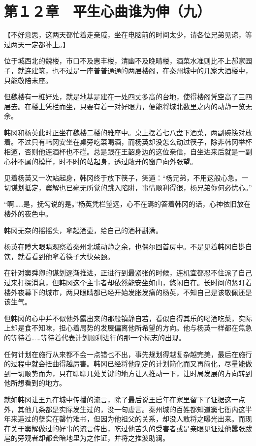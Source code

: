 \section{第１２章　平生心曲谁为伸（九）}

【不好意思，这两天都忙着走亲戚，坐在电脑前的时间太少，请各位兄弟见谅，等过两天一定都补上。】

位于城西北的魏楼，市口不及惠丰楼，清幽不及晚晴楼，酒菜水准则比不上郝家园子，就连建筑，也不过是一座普普通通的两层楼阁，在秦州城中的几家大酒楼中，只能敬陪末座。

但魏楼有一桩好处，就是地基是建在一处四丈多高的台地，使得楼阁凭空高了三四层去。在楼上凭栏而坐，只要有着一对好眼力，便能将城北数里之内的动静一览无余。

韩冈和杨英此时正坐在魏楼二楼的雅座中。桌上摆着七八盘下酒菜，两副碗筷对放着。不过只有韩冈安坐在桌旁吃菜喝酒，而杨英却没怎么动过筷子，除非韩冈举杯相邀，否则他连酒杯也不碰。总是跟在王韶身边的这位亲信，自坐进来后就是一副心神不属的模样，时不时的站起身，透过敞开的窗户向外张望。

见着杨英又一次站起身，韩冈终于放下筷子，笑道：“杨兄弟，不用这般心急。一切谋划抵定，窦解也已毫无所觉的跳入陷阱，事情顺利得很，杨兄弟你何必忧心。”

“啊……是，抚勾说的是。”杨英凭栏望远，心不在焉的答着韩冈的话，心神依旧放在楼外的夜色中。

韩冈无奈的摇摇头，拿起酒壶，给自己的酒杯斟满。

杨英在瞪大眼睛观察着秦州北城动静之余，也偶尔回首房中。不是见着韩冈自斟自饮，就看看到他拿着筷子大快朵颐。

在针对窦舜卿的谋划逐渐推进，正进行到最紧张的时候，连机宜都忍不住派了自己过来打探消息，但韩冈这个主事者却依然能安坐如山，悠闲自在。长时间的紧盯着楼外夜幕下的城市，两只眼睛都已经开始发胀发痛的杨英，不知自己是该敬佩还是该生气。

但韩冈的心中并不似他外露出来的那般镇静自若，看似自得其乐的喝酒吃菜，实际上却是食不知味，担心着局势的发展偏离他所希望的方向。他与杨英一样都在焦急的等待着……等待着代表计划顺利进行的那一个标志的出现。

任何计划在施行从来都不会一点错也不出，事先规划得越复杂越完美，最后在施行的过程中就会扭曲得越厉害。韩冈已经将他制定的计划简化而又再简化，尽量能做到一切顺势而为，只在聊聊几处关键的地方让人推动一下，让时局发展的方向转到他所想看到的地方。

就如韩冈让王九在城中传播的流言，除了最后说王启年在家里留下了证据这一点外，其他几条都是实际发生过的，没一句虚言。秦州城的百姓都知道窦七衙内这半年来造过的孽实在罄竹难书，但因为他祖父的关系，却没人敢将之曝光出来。而现在关于窦解做过的好事的流言传出，吃过他苦头的受害者或是亲眼见证过他嚣张跋扈的旁观者却都会暗地里为之作证，并将之推波助澜。

